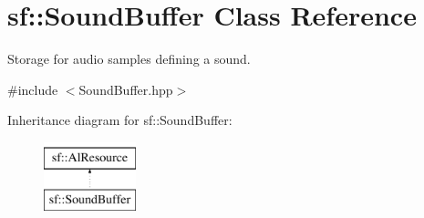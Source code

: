 \hypertarget{classsf_1_1_sound_buffer}{}\section{sf\+:\+:Sound\+Buffer Class Reference}
\label{classsf_1_1_sound_buffer}


Storage for audio samples defining a sound.  




{\ttfamily \#include $<$Sound\+Buffer.\+hpp$>$}

Inheritance diagram for sf\+:\+:Sound\+Buffer\+:\begin{figure}[H]
\begin{center}
\leavevmode
\includegraphics[height=2.000000cm]{classsf_1_1_sound_buffer}
\end{center}
\end{figure}
